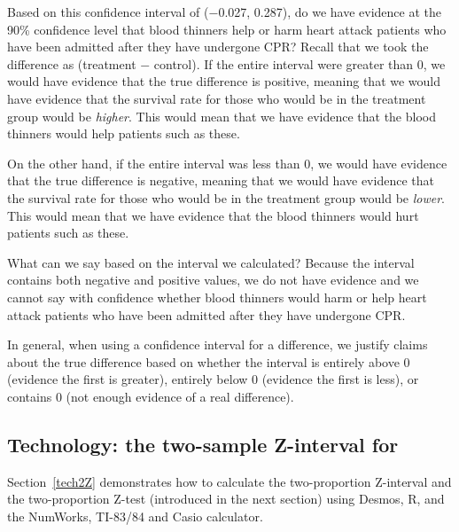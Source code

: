\begin{examplewrap}
\begin{nexample}{Based on this confidence interval of ($-$0.027, 0.287), do we have evidence at the 90\% confidence level that blood thinners help or harm heart attack patients who have been admitted after they have undergone CPR?}
Recall that we took the difference as (treatment $-$ control).  If the entire interval were greater than 0, we would have evidence that the true difference is positive, meaning that we would have evidence that the survival rate for those who would be in the treatment group would be \emph{higher}.  This would mean that we have evidence that the blood thinners would help patients such as these.  

On the other hand, if the entire interval was less than 0, we would have evidence that the true difference is negative, meaning that we would have evidence that the survival rate for those who would be in the treatment group would be \emph{lower}.  This would mean that we have evidence that the blood thinners would hurt patients such as these.    

What can we say based on the interval we calculated?  Because the interval contains both negative and positive values, we do not have evidence and we cannot say
  with confidence whether blood thinners would harm or help
  heart attack patients who have been admitted after
  they have undergone CPR.

\end{nexample}
\end{examplewrap}


  
In general, when using a confidence interval for a difference, we justify claims about the true difference based on whether the interval is entirely above 0 (evidence the first is greater), entirely below 0 (evidence the first is less), or contains 0 (not enough evidence of a real difference).


\D{\newpage}

\subsection[Technology: the two-sample Z-interval for $p_1 - p_2$]{Technology: the two-sample Z-interval for }
\label{2propZint}

\noindent  Section~\ref{tech2Z} demonstrates how to calculate the two-proportion Z-interval and the two-proportion Z-test (introduced in the next section) using Desmos, R, and the NumWorks, TI-83/84 and Casio calculator. 


